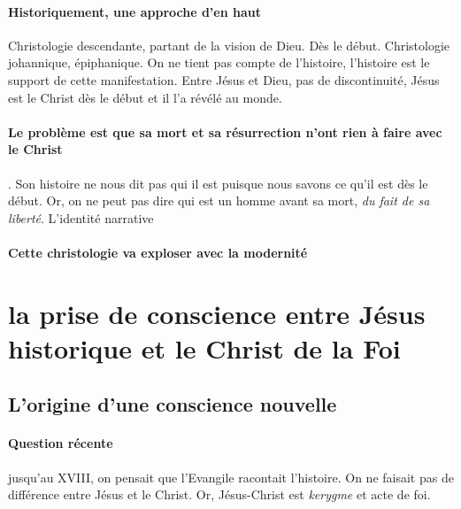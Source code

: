 \paragraph{Historiquement, une approche d'en haut} Christologie descendante, partant de la vision de Dieu. Dès le début. Christologie johannique, épiphanique. On ne tient pas compte de l'histoire, l'histoire est le support de cette manifestation. Entre Jésus et Dieu, pas de discontinuité, Jésus est le Christ dès le début et il l'a révélé au monde.  

\paragraph{Le problème est que sa mort et sa résurrection n'ont rien à faire avec le Christ}. Son histoire ne nous dit pas qui il est puisque nous savons ce qu'il est dès le début. Or, on ne peut pas dire qui est un homme avant sa mort, \textit{du fait de sa liberté}. L'identité narrative  

\paragraph{Cette christologie va exploser avec la modernité}


\section{la prise de conscience entre Jésus historique et le Christ de la Foi}




\subsection{L’origine d’une conscience nouvelle}
\paragraph{Question récente} jusqu'au XVIII, on pensait que l'Evangile racontait l'histoire. On ne faisait pas de différence entre Jésus et le Christ. Or, Jésus-Christ est \textit{kerygme} et acte de foi.

